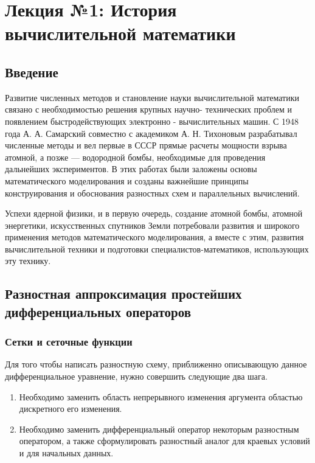 \section*{Лекция №1: История вычислительной математики}

\subsection*{Введение}

Развитие численных методов и становление науки вычислительной математики связано с необходимостью решения крупных научно- технических проблем и появлением быстродействующих электронно - вычислительных машин. С 1948 года  А. А. Самарский совместно с академиком А. Н. Тихоновым разрабатывал численные методы и вел первые в СССР прямые расчеты мощности взрыва атомной, а позже — водородной бомбы, необходимые для проведения дальнейших экспериментов. В этих работах были заложены основы математического моделирования и созданы важнейшие принципы конструирования и обоснования разностных схем и параллельных вычислений. 

Успехи ядерной физики, и в первую очередь, создание атомной бомбы, атомной энергетики, искусственных спутников Земли потребовали развития и широкого применения методов математического моделирования, а вместе с этим, развития вычислительной техники и подготовки специалистов-математиков, использующих эту технику.

\subsection*{Разностная аппроксимация простейших дифференциальных операторов}

\subsubsection*{Сетки и сеточные функции}

Для того чтобы написать разностную схему, приближенно описывающую данное дифференциальное уравнение, нужно совершить следующие два шага.

\begin{enumerate}
	\item Необходимо заменить область непрерывного изменения аргумента областью дискретного его изменения.
	\item Необходимо заменить дифференциальный оператор некоторым разностным оператором, а также сформулировать разностный аналог для краевых условий и для начальных данных.
\end{enumerate}

